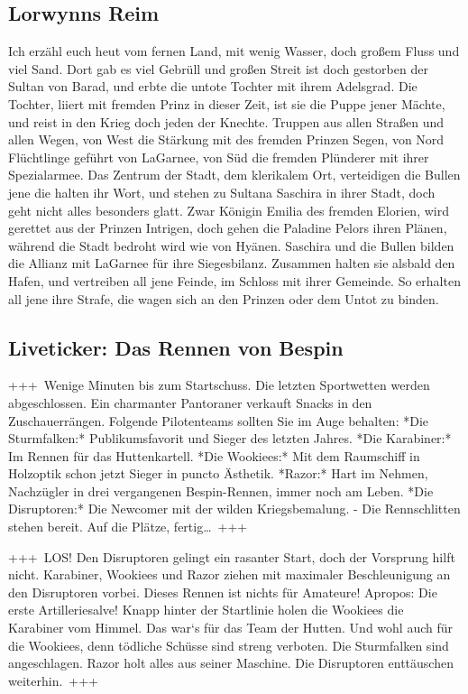 \subsection{Lorwynns Reim}
Ich erzähl euch heut vom fernen Land, mit wenig Wasser, doch großem Fluss und viel Sand.
Dort gab es viel Gebrüll und großen Streit ist doch gestorben der Sultan von Barad, und erbte die untote Tochter mit ihrem Adelsgrad.
Die Tochter, liiert mit fremden Prinz in dieser Zeit, ist sie die Puppe jener Mächte, und reist in den Krieg doch jeden der Knechte.
Truppen aus allen Straßen und allen Wegen, von West die Stärkung mit des fremden Prinzen Segen, von Nord Flüchtlinge geführt von LaGarnee, von Süd die fremden Plünderer mit ihrer Spezialarmee.
Das Zentrum der Stadt, dem klerikalem Ort, verteidigen die Bullen jene die halten ihr Wort, und stehen zu Sultana Saschira in ihrer Stadt, doch geht nicht alles besonders glatt.
Zwar Königin Emilia des fremden Elorien, wird gerettet aus der Prinzen Intrigen, doch gehen die Paladine Pelors ihren Plänen, während die Stadt bedroht wird wie von Hyänen.
Saschira und die Bullen bilden die Allianz mit LaGarnee für ihre Siegesbilanz.
Zusammen halten sie alsbald den Hafen, und vertreiben all jene Feinde, im Schloss mit ihrer Gemeinde.
So erhalten all jene ihre Strafe, die wagen sich an den Prinzen oder dem Untot zu binden.

\subsection{Liveticker: Das Rennen von Bespin}
+++~Wenige Minuten bis zum Startschuss.
    Die letzten Sportwetten werden abgeschlossen.
    Ein charmanter Pantoraner verkauft Snacks in den Zuschauerrängen.
    Folgende Pilotenteams sollten Sie im Auge behalten:
    *Die Sturmfalken:* Publikumsfavorit und Sieger des letzten Jahres.
    *Die Karabiner:* Im Rennen für das Huttenkartell.
    *Die Wookiees:* Mit dem Raumschiff in Holzoptik schon jetzt Sieger in puncto Ästhetik.
    *Razor:* Hart im Nehmen, Nachzügler in drei vergangenen Bespin-Rennen, immer noch am Leben.
    *Die Disruptoren:* Die Newcomer mit der wilden Kriegsbemalung.
    - Die Rennschlitten stehen bereit.
    Auf die Plätze, fertig…~+++

+++~LOS!
    Den Disruptoren gelingt ein rasanter Start, doch der Vorsprung hilft nicht.
    Karabiner, Wookiees und Razor ziehen mit maximaler Beschleunigung an den Disruptoren vorbei.
    Dieses Rennen ist nichts für Amateure!
    Apropos: Die erste Artilleriesalve!
    Knapp hinter der Startlinie holen die Wookiees die Karabiner vom Himmel.
    Das war‘s für das Team der Hutten.
    Und wohl auch für die Wookiees, denn tödliche Schüsse sind streng verboten.
    Die Sturmfalken sind angeschlagen.
    Razor holt alles aus seiner Maschine.
    Die Disruptoren enttäuschen weiterhin.~+++

